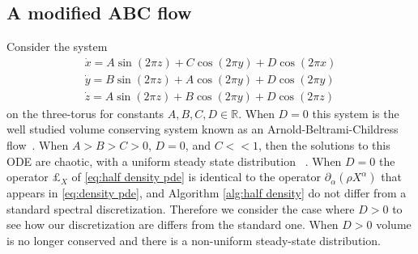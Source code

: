 \documentclass[final,leqno]{siamart}
\begin{document}
%
%


\subsection{A modified ABC flow}
\label{sec:ABC_flow}

Consider the system
\begin{align}
	\dot{x} = A \sin( 2\pi z) + C \cos(2\pi y)  + D \cos(2\pi x)\\
	\dot{y} = B \sin( 2\pi z) + A \cos(2\pi y)  + D \cos(2\pi y)\\
	\dot{z} = A \sin( 2\pi z) + B \cos(2\pi y)  + D \cos(2\pi z)
\end{align}
on the three-torus for constants $A,B,C,D \in \mathbb{R}$.  
When $D=0$ this system is the well studied volume conserving system known as an Arnold-Beltrami-Childress flow~\cite{ArnoldKhesin1992}.
When $A > B > C > 0$, $D=0$, and $C << 1$, then the solutions to this ODE are chaotic, with a uniform steady state distribution ~\cite{MajdaBertozzi2002}.
When $D=0$ the operator $\pounds_{X}$ of \eqref{eq:half density pde} is identical to the operator $\partial_{\alpha}( \rho X^{\alpha})$ that appears in \eqref{eq:density pde}, and Algorithm \ref{alg:half density} do not differ from a standard spectral discretization.
Therefore we consider the case where $D > 0$ to see how our discretization are differs from the standard one.
When $D> 0$ volume is no longer conserved and there is a non-uniform steady-state distribution.
\end{document}
